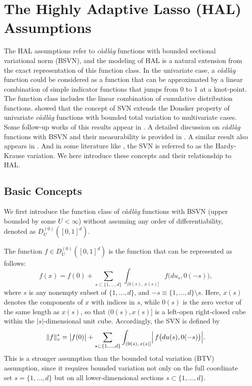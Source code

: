 \section{The Highly Adaptive Lasso (HAL) Assumptions} 
\label{The Highly Adaptive Lasso (HAL) Assumptions}

The HAL assumptions refer to \emph{càdlàg} functions with bounded sectional variational norm (BSVN), and the modeling of HAL is a natural extension from the exact representation of this function class. In the univariate case, a \emph{c\`adl\`ag} function could be considered as a function that can be approximated by a linear combination of simple indicator functions that jumps from 0 to 1 at a knot-point. The function class includes the linear combination of cumulative distribution functions.  \citet{gill2001inefficient} showed that the concept of SVN extends the Donsker property of univariate \emph{càdlàg} functions with bounded total variation to multivariate cases. Some follow-up works of this results appear in \citet{van2017generally, rytgaard2023estimation}. A detailed discussion on \emph{c\`adl\`ag} functions with BSVN and their measurability is provided in \citet[Section~2]{munch2024estimating}. A similar result also appears in \citet{radulovic2017weak}. And in some literature like \citet{radulovic2017weak, ki2024mars}, the SVN is referred to as the Hardy-Krause variation. We here introduce these concepts and their relationship to HAL.

\subsection{Basic Concepts} \label{Basic Concepts}
We first introduce the function class of \emph{c\`adl\`ag} functions with BSVN (upper bounded by some \(U < \infty\)) without assuming any order of differentiability, denoted as $D^{(0)}_U([0,1]^d)$.
\begin{definition}\label{assump:cadlag with BSVN}
The function $f\in D^{(0)}_U([0,1]^d)$ is the function that can be represented as follows:
\[
  f(x)
  = f(0)
    + \sum_{s\subset\{1,\dots,d\}}
      \int_{(0(s),\,x(s)]} f\bigl(du_s,0(-s)\bigr),
\]
where \(s\) is any nonempty subset of \(\{1,\dots,d\}\), and $-s \equiv \{1,\dots,d\} \setminus s$. Here, $x(s)$ denotes the components of $x$ with indices in $s$, while $0(s)$ is the zero vector of the same length as $x(s)$, so that $(0(s), x(s)]$ is a left-open right-closed cube within the $\vert s \vert$-dimensional unit cube. Accordingly, the SVN is defined by
\[
  \Vert f \Vert_v^*
  = \bigl|f(0)\bigr|
    + \sum_{s\subset\{1,\dots,d\}}
      \int_{(0(s),\,x(s)]}
      \Bigl|\,f\bigl(du(s),0(-s)\bigr)\Bigr|.
\]
This is a stronger assumption than the bounded total variation (BTV) assumption, since it requires bounded variation not only on the full coordinate set \(s=\{1,\dots,d\}\) but on all lower‑dimensional sections \(s\subset\{1,\dots,d\}\).  
\end{definition}

